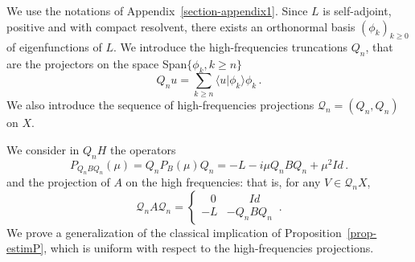 \documentclass[10pt]{amsart}
\theoremstyle{definition}\newtheorem{defi}[theo]{Definition}\newtheorem{rema}[theo]{Remark}\newtheorem{exam}[theo]{Example}\newtheorem{exem}[theo]{Example}\newtheorem{nota}[theo]{Notation}
\newcommand{\Qc}{\mathcal{Q}}
\begin{document}
We use the notations of Appendix~\ref{section-appendix1}. Since $L$ is self-adjoint, positive and with compact resolvent, there exists an orthonormal basis $(\phi_k)_{k\geq 0}$ of eigenfunctions of $L$. We introduce the high-frequencies truncations $Q_n$, that are the projectors on the space Span$\{\phi_k,k\geq n\}$
\[
Q_nu=\sum_{k\geq n} \langle u | \phi_k\rangle \phi_k\,.
\]
We also introduce the sequence of high-frequencies projections $\Qc_n=(Q_n,Q_n)$ on $X$.

We consider in $Q_n H$ the operators
\[
P_{Q_n B Q_n}(\mu)=Q_nP_B(\mu)Q_n= - L -i\mu Q_nBQ_n + \mu^2 Id\,.
\]
and the projection of $A$ on the high frequencies: that is, for any $V\in\Qc_n X$,
\[
\Qc_n A \Qc_n =
\begin{cases}
\;\;\; 0 & \qquad Id \\
-L & -Q_n B Q_n
\end{cases}\,.
\]
We prove a generalization of the classical implication of Proposition~\ref{prop-estimP}, which is uniform with respect to the high-frequencies projections.
\end{document}
